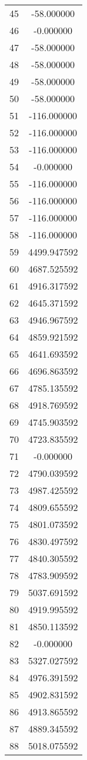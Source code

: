 \documentclass[12pt]{article}
\begin{document}
\begin{longtable}{@{}cc@{}}
45 & -58.000000 \\
46 & -0.000000 \\
47 & -58.000000 \\
48 & -58.000000 \\
49 & -58.000000 \\
50 & -58.000000 \\
51 & -116.000000 \\
52 & -116.000000 \\
53 & -116.000000 \\
54 & -0.000000 \\
55 & -116.000000 \\
56 & -116.000000 \\
57 & -116.000000 \\
58 & -116.000000 \\
59 & 4499.947592 \\
60 & 4687.525592 \\
61 & 4916.317592 \\
62 & 4645.371592 \\
63 & 4946.967592 \\
64 & 4859.921592 \\
65 & 4641.693592 \\
66 & 4696.863592 \\
67 & 4785.135592 \\
68 & 4918.769592 \\
69 & 4745.903592 \\
70 & 4723.835592 \\
71 & -0.000000 \\
72 & 4790.039592 \\
73 & 4987.425592 \\
74 & 4809.655592 \\
75 & 4801.073592 \\
76 & 4830.497592 \\
77 & 4840.305592 \\
78 & 4783.909592 \\
79 & 5037.691592 \\
80 & 4919.995592 \\
81 & 4850.113592 \\
82 & -0.000000 \\
83 & 5327.027592 \\
84 & 4976.391592 \\
85 & 4902.831592 \\
86 & 4913.865592 \\
87 & 4889.345592 \\
88 & 5018.075592 \\

\end{longtable}
\end{document}
